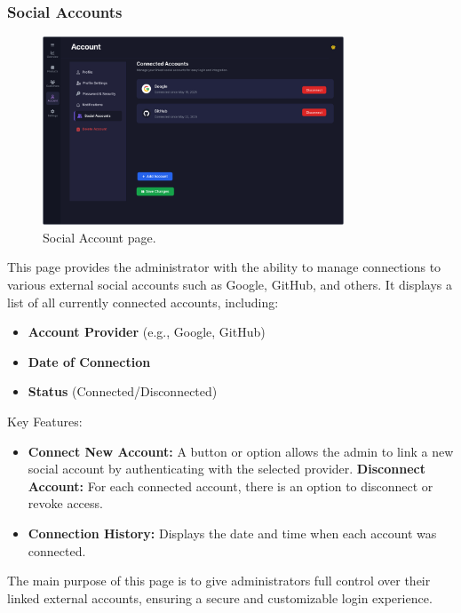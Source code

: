 \documentclass[12pt]{article}
\begin{document}
	\subsubsection{Social Accounts}
	\begin{figure}[h]
		\centering
		\includegraphics[width=0.8\textwidth]{pictures/admin/Connected_Accounts_Admin}
		\caption{Social Account page.}\label{fig:figure8}
	\end{figure}
	This page provides the administrator with the ability to manage connections to various external social accounts such as Google, GitHub, and others. It displays a list of all currently connected accounts, including:
	\begin{itemize}
		\item \textbf{Account Provider} (e.g., Google, GitHub)
		\item \textbf{Date of Connection}
		\item \textbf{Status} (Connected/Disconnected)
	\end{itemize}
	Key Features:
	\begin{itemize}
		\item \textbf{Connect New Account:} A button or option allows the admin to link a new social account by authenticating with the selected provider.
		\textbf{Disconnect Account:} For each connected account, there is an option to disconnect or revoke access.
		\item \textbf{Connection History:} Displays the date and time when each account was connected.
	\end{itemize}
	The main purpose of this page is to give administrators full control over their linked external accounts, ensuring a secure and customizable login experience.
	
	
\end{document}
